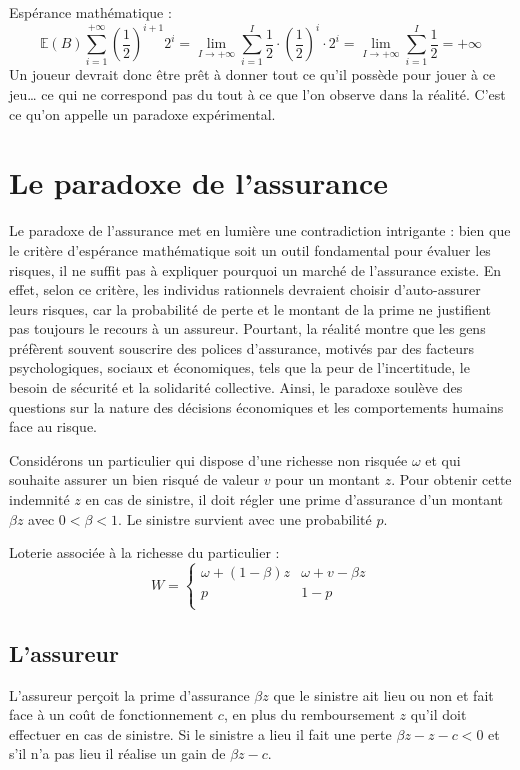 \documentclass[a4paper, 12pt]{report}
\begin{document}
Espérance mathématique :
$$
\mathbb{E}(B)\sum_{i=1}^{+\infty}\left(\frac{1}{2}\right)^{i+1}2^i=\lim_{I \to +\infty} \sum_{i=1}^{I}\frac{1}{2}\cdot\left(\frac{1}{2}\right)^i\cdot 2^i=\lim_{I \to +\infty} \sum_{i=1}^{I}\frac{1}{2}=+\infty
$$
Un joueur devrait donc être prêt à donner tout ce qu'il possède pour jouer à ce jeu… ce qui ne correspond pas du tout à ce que l'on observe dans la réalité. C'est ce qu'on appelle un paradoxe expérimental. 

\section{Le paradoxe de l'assurance}

Le paradoxe de l'assurance met en lumière une contradiction intrigante : bien que le critère d'espérance mathématique soit un outil fondamental pour évaluer les risques, il ne suffit pas à expliquer pourquoi un marché de l'assurance existe. En effet, selon ce critère, les individus rationnels devraient choisir d'auto-assurer leurs risques, car la probabilité de perte et le montant de la prime ne justifient pas toujours le recours à un assureur. Pourtant, la réalité montre que les gens préfèrent souvent souscrire des polices d'assurance, motivés par des facteurs psychologiques, sociaux et économiques, tels que la peur de l'incertitude, le besoin de sécurité et la solidarité collective. Ainsi, le paradoxe soulève des questions sur la nature des décisions économiques et les comportements humains face au risque.

Considérons un particulier qui dispose d'une richesse non risquée $\omega$ et qui souhaite assurer un bien risqué de valeur $v$ pour un montant $z$. Pour obtenir cette indemnité $z$ en cas de sinistre, il doit régler une prime d'assurance d'un montant $\beta z$ avec $0 < \beta < 1$. Le sinistre survient avec une probabilité $p$.

Loterie associée à la richesse du particulier :
$$
W= \left\{\begin{matrix}
	\omega + (1-\beta)z& \omega + v -\beta z \\
	p & 1-p \\
\end{matrix}\right.
$$

\subsection{L'assureur}

L'assureur perçoit la prime d'assurance $\beta z$ que le sinistre ait lieu ou non et fait face à un coût de fonctionnement $c$,
en plus du remboursement $z$ qu'il doit effectuer en cas de
sinistre. Si le sinistre a lieu il fait une perte $\beta z - z - c < 0$
et s'il n'a pas lieu il réalise un gain de $\beta z - c$.
\end{document}
